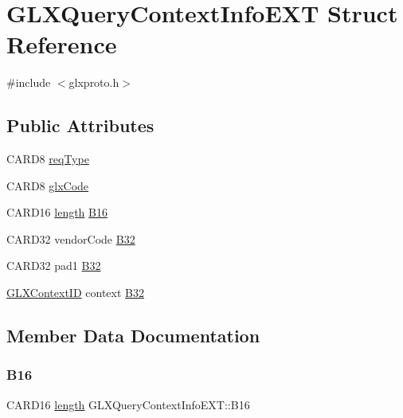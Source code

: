 \hypertarget{struct_g_l_x_query_context_info_e_x_t}{}\section{G\+L\+X\+Query\+Context\+Info\+E\+XT Struct Reference}
\label{struct_g_l_x_query_context_info_e_x_t}


{\ttfamily \#include $<$glxproto.\+h$>$}

\subsection*{Public Attributes}
\begin{DoxyCompactItemize}
\item 
C\+A\+R\+D8 \hyperlink{struct_g_l_x_query_context_info_e_x_t_aa6ece1caed2f82884de9bdd48684bdf8}{req\+Type}
\item 
C\+A\+R\+D8 \hyperlink{struct_g_l_x_query_context_info_e_x_t_a0fd56252cd2e36e1cc9d3c1715e4a3b9}{glx\+Code}
\item 
C\+A\+R\+D16 \hyperlink{glcorearb_8h_ab9c919755bde3b34349e23a32b4e0fa7}{length} \hyperlink{struct_g_l_x_query_context_info_e_x_t_a80e416079b8dbc011f25e997ceb27381}{B16}
\item 
C\+A\+R\+D32 vendor\+Code \hyperlink{struct_g_l_x_query_context_info_e_x_t_a70806e18d002ba353e30d449162df199}{B32}
\item 
C\+A\+R\+D32 pad1 \hyperlink{struct_g_l_x_query_context_info_e_x_t_aba3b8da73b9ab550402c4615373223db}{B32}
\item 
\hyperlink{glx_8h_a17c7ca5b76cc448032df0b5352803005}{G\+L\+X\+Context\+ID} context \hyperlink{struct_g_l_x_query_context_info_e_x_t_a34ce8de77df0a22655cde164d9f928b1}{B32}
\end{DoxyCompactItemize}


\subsection{Member Data Documentation}
\mbox{\label{struct_g_l_x_query_context_info_e_x_t_a80e416079b8dbc011f25e997ceb27381}} 
\subsubsection{\texorpdfstring{B16}{B16}}
{\footnotesize\ttfamily C\+A\+R\+D16 \hyperlink{glcorearb_8h_ab9c919755bde3b34349e23a32b4e0fa7}{length} G\+L\+X\+Query\+Context\+Info\+E\+X\+T\+::\+B16}

